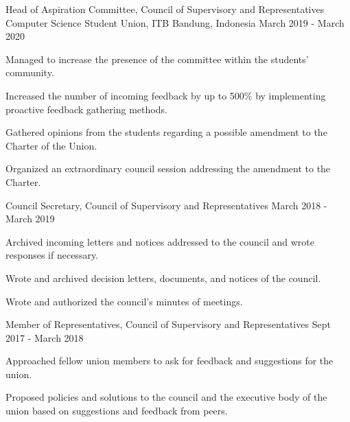 \begin{cventries}
\cventry
{Head of Aspiration Committee, Council of Supervisory and Representatives} %
{Computer Science Student Union, ITB} %
{Bandung, Indonesia} %
{March 2019 - March 2020} %
{
	\begin{cvitems} %
		\item {Managed to increase the presence of the committee within the students' community.}
		\item {Increased the number of incoming feedback by up to 500\% by implementing proactive feedback gathering methods.}
		\item {Gathered opinions from the students regarding a possible amendment to the Charter of the Union.}
		\item {Organized an extraordinary council session addressing the amendment to the Charter.}
	\end{cvitems}
}

\cventry
{Council Secretary, Council of Supervisory and Representatives} %
{} %
{} %
{March 2018 - March 2019} %
{
	\begin{cvitems} %
		\item {Archived incoming letters and notices addressed to the council and wrote responses if necessary.}
		\item {Wrote and archived decision letters, documents, and notices of the council.}
		\item {Wrote and authorized the council's minutes of meetings.}
	\end{cvitems}
}

\cventry
{Member of Representatives, Council of Supervisory and Representatives} %
{} %
{} %
{Sept 2017 - March 2018} %
{
	\begin{cvitems} %
		\item {Approached fellow union members to ask for feedback and suggestions for the union.}
		\item {Proposed policies and solutions to the council and the executive body of the union based on suggestions and feedback from peers.}
	\end{cvitems}
}

\end{cventries}
